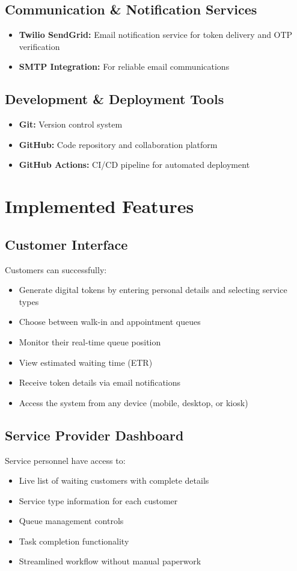 \documentclass[12pt,a4paper]{report}
\begin{document}
\subsection{Communication \& Notification Services}
\begin{itemize}
    \item \textbf{Twilio SendGrid:} Email notification service for token delivery and OTP verification
    \item \textbf{SMTP Integration:} For reliable email communications
\end{itemize}

\subsection{Development \& Deployment Tools}
\begin{itemize}
    \item \textbf{Git:} Version control system
    \item \textbf{GitHub:} Code repository and collaboration platform
    \item \textbf{GitHub Actions:} CI/CD pipeline for automated deployment
\end{itemize}

\section{Implemented Features}

\subsection{Customer Interface}
Customers can successfully:
\begin{itemize}
    \item Generate digital tokens by entering personal details and selecting service types
    \item Choose between walk-in and appointment queues
    \item Monitor their real-time queue position
    \item View estimated waiting time (ETR)
    \item Receive token details via email notifications
    \item Access the system from any device (mobile, desktop, or kiosk)
\end{itemize}

\subsection{Service Provider Dashboard}
Service personnel have access to:
\begin{itemize}
    \item Live list of waiting customers with complete details
    \item Service type information for each customer
    \item Queue management controls
    \item Task completion functionality
    \item Streamlined workflow without manual paperwork
\end{itemize}
\end{document}
